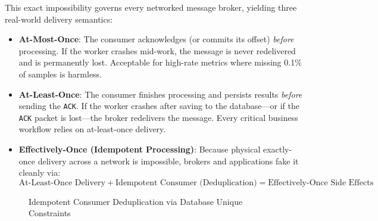 This exact impossibility governs every networked message broker, yielding three real-world delivery semantics:
\begin{itemize}[leftmargin=18pt]
  \item \textbf{At-Most-Once}: The consumer acknowledges (or commits its offset) \emph{before} processing. If the worker crashes mid-work, the message is never redelivered and is permanently lost. Acceptable for high-rate metrics where missing 0.1\% of samples is harmless.
  \item \textbf{At-Least-Once}: The consumer finishes processing and persists results \emph{before} sending the \texttt{ACK}. If the worker crashes after saving to the database---or if the \texttt{ACK} packet is lost---the broker redelivers the message. Every critical business workflow relies on at-least-once delivery.
  \item \textbf{Effectively-Once (Idempotent Processing)}: Because physical exactly-once delivery across a network is impossible, brokers and applications fake it cleanly via:
  \begin{equation}
  \text{At-Least-Once Delivery} + \text{Idempotent Consumer (Deduplication)} = \text{Effectively-Once Side Effects}
  \end{equation}
\end{itemize}

\begin{figure}[htbp]
\centering
{}
\caption{Idempotent Consumer Deduplication via Database Unique Constraints}
\label{fig:v4-ch04-idempotent-consumer}
\end{figure}

